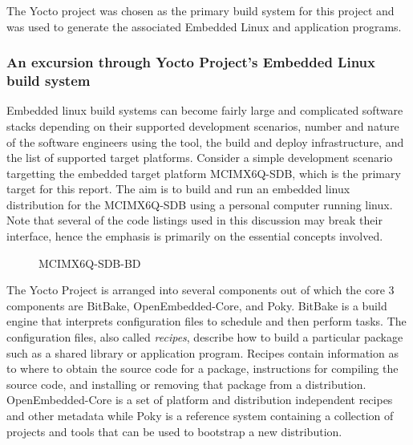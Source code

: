 The Yocto project was chosen as the primary build system for this project and was used to generate the associated Embedded Linux and application programs.

\subsubsection{An excursion through Yocto Project's Embedded Linux build system}
\label{section:yocto-demo}

Embedded linux build systems can become fairly large and complicated software stacks depending on their supported development scenarios, number and nature of the software engineers using the tool, the build and deploy infrastructure, and the list of supported target platforms. Consider a simple development scenario targetting the embedded target platform MCIMX6Q-SDB, which is the primary target for this report. The aim is to build and run an embedded linux distribution for the MCIMX6Q-SDB using a personal computer running linux. Note that several of the code listings used in this discussion may break their interface, hence the emphasis is primarily on the essential concepts involved.

\begin{figure}[h]
	\centering
	\caption{MCIMX6Q-SDB-BD}
	\label{fig:mcimx6q-sdb}
\end{figure}

The Yocto Project is arranged into several components out of which the core 3 components are BitBake, OpenEmbedded-Core, and Poky. BitBake is a build engine that interprets configuration files to schedule and then perform tasks. The configuration files, also called  \textit{recipes}, describe how to build a particular package such as a shared library or application program. Recipes contain information as to where to obtain the source code for a package, instructions for compiling the source code, and installing or removing that package from a distribution. OpenEmbedded-Core is a set of platform and distribution independent recipes and other metadata while Poky is a reference system containing a collection of projects and tools that can be used to bootstrap a new distribution.

